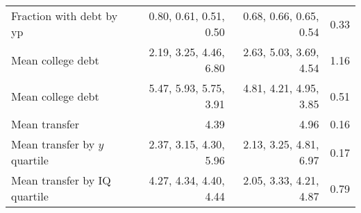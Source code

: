 \begin{tabular}{lrrr}
Fraction with debt by yp & 0.80, 0.61, 0.51, 0.50  & 0.68, 0.66, 0.65, 0.54  & 0.33  \\ 
Mean college debt & 2.19, 3.25, 4.46, 6.80  & 2.63, 5.03, 3.69, 4.54  & 1.16  \\ 
Mean college debt & 5.47, 5.93, 5.75, 3.91  & 4.81, 4.21, 4.95, 3.85  & 0.51  \\ 
Mean transfer & 4.39  & 4.96  & 0.16  \\ 
Mean transfer by $y$ quartile & 2.37, 3.15, 4.30, 5.96  & 2.13, 3.25, 4.81, 6.97  & 0.17  \\ 
Mean transfer by IQ quartile & 4.27, 4.34, 4.40, 4.44  & 2.05, 3.33, 4.21, 4.87  & 0.79  \\ 
\hline
\end{tabular}%
